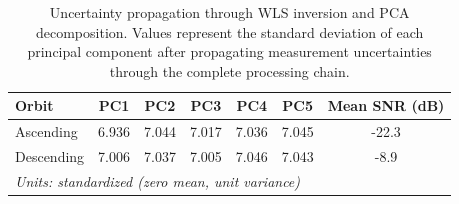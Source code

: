 
\begin{table}[htbp]
\centering
\caption{Uncertainty propagation through WLS inversion and PCA decomposition. Values represent the standard deviation of each principal component after propagating measurement uncertainties through the complete processing chain.}
\label{tab:uncertainty_propagation}
\begin{tabular}{lcccccc}
\toprule
\textbf{Orbit} & \textbf{PC1} & \textbf{PC2} & \textbf{PC3} & \textbf{PC4} & \textbf{PC5} & \textbf{Mean SNR (dB)} \\
\midrule
Ascending & 6.936 & 7.044 & 7.017 & 7.036 & 7.045 & -22.3 \\
Descending & 7.006 & 7.037 & 7.005 & 7.046 & 7.043 & -8.9 \\
\midrule
\multicolumn{7}{l}{\textit{Units: standardized (zero mean, unit variance)}} \\
\bottomrule
\end{tabular}
\end{table}
